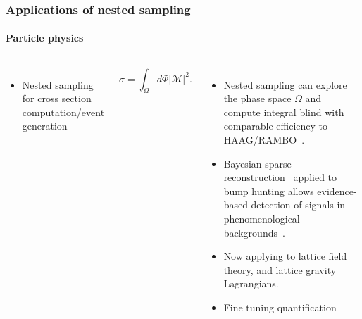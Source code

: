 \documentclass[aspectratio=169]{beamer}
\begin{document}
    \begin{frame}
        \frametitle{Applications of nested sampling}
        \framesubtitle{Particle physics}
        \begin{columns}
            \begin{columns}
                \begin{itemize}
                    \item Nested sampling for cross section computation/event generation
                \end{itemize}
                \[\sigma = \int_\Omega d\Phi |\mathcal{M}|^2.\]
            \end{columns}
            \begin{itemize}
                \item Nested sampling can explore the phase space $\Omega$ and compute integral blind with comparable efficiency to HAAG/RAMBO~.
                \item Bayesian sparse reconstruction~ applied to bump hunting allows evidence-based detection of signals in phenomenological backgrounds~.
                \item Now applying to lattice field theory, and lattice gravity Lagrangians.
                \item Fine tuning quantification
            \end{itemize}

\end{columns}
\end{frame}
\end{document}
